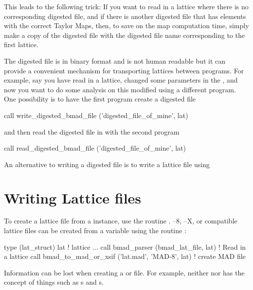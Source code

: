 This leads to the following trick: If you want to read in a lattice
where there is no corresponding digested file, and if there is another
digested file that has elements with the correct Taylor Maps, then, to
save on the map computation time, simply make a copy of the digested
file with the digested file name corresponding to the first lattice.

The digested file is in binary format and is not human readable but it
can provide a convenient mechanism for transporting lattices between
programs. For example, say you have read in a lattice, changed
some parameters in the , and now you want to do some
analysis on this modified  using a different program. 
One possibility is to have the first program create a digested file
\begin{example}
  call write_digested_bmad_file ('digested_file_of_mine', lat)
\end{example}
and then read the digested file in with the second program
\begin{example}
  call read_digested_bmad_file ('digested_file_of_mine', lat)
\end{example}
An alternative to writing a digested file is to write a lattice file
using 

\section{Writing Lattice files}
\label{s:lat.write}

To create a \bmad lattice file from a  instance, use the routine
.
\mad--8, \mad--X, or  compatible lattice 
files can be created from a  variable 
using the routine :
\begin{example}
  type (lat_struct) lat             ! lattice
  ...
  call bmad_parser (bmad_lat_file, lat)               ! Read in a lattice
  call bmad_to_mad_or_xsif ('lat.mad', 'MAD-8', lat)  ! create MAD file
\end{example}
Information can be lost when creating a \mad or  file.
For example, neither \mad nor  has the concept of 
things such as s and s.

